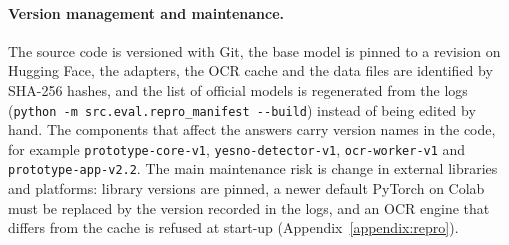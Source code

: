 \paragraph{Version management and maintenance.} The source code is versioned with Git, the
base model is pinned to a revision on Hugging Face, the adapters, the OCR cache and the data
files are identified by SHA-256 hashes, and the list of official models is regenerated from
the logs (\texttt{python -m src.eval.repro\_manifest -{}-build}) instead of being edited by
hand. The components that affect the answers carry version names in the code, for example
\texttt{prototype-core-v1}, \texttt{yesno-detector-v1}, \texttt{ocr-worker-v1} and
\texttt{prototype-app-v2.2}. The main maintenance risk is change in external libraries and
platforms: library versions are pinned, a newer default PyTorch on Colab must be replaced by
the version recorded in the logs, and an OCR engine that differs from the cache is refused at
start-up (Appendix~\ref{appendix:repro}).
